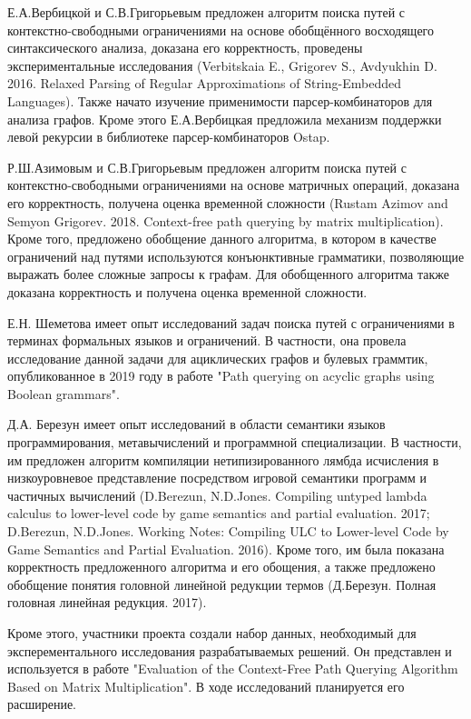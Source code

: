 \documentclass[12pt]{article}  %
\theoremstyle{remark}
\begin{document}
Е.А.Вербицкой и С.В.Григорьевым предложен алгоритм поиска путей с контекстно-свободными ограничениями на основе обобщённого восходящего синтаксического анализа, доказана его корректность, проведены экспериментальные исследования (Verbitskaia E., Grigorev S., Avdyukhin D. 2016. Relaxed Parsing of Regular Approximations of String-Embedded Languages). Также начато изучение применимости парсер-комбинаторов для анализа графов. Кроме этого Е.А.Вербицкая предложила механизм поддержки левой рекурсии в библиотеке парсер-комбинаторов Ostap.

Р.Ш.Азимовым и С.В.Григорьевым предложен алгоритм поиска путей с контекстно-свободными ограничениями на основе матричных операций, доказана его корректность, получена оценка временной сложности (Rustam Azimov and Semyon Grigorev. 2018. Context-free path querying by matrix multiplication). Кроме того, предложено обобщение данного алгоритма, в котором в качестве ограничений над путями используются конъюнктивные грамматики, позволяющие выражать более сложные запросы к графам. Для обобщенного алгоритма также доказана корректность и получена оценка временной сложности.

Е.Н. Шеметова имеет опыт исследований задач поиска путей с ограничениями в терминах формальных языков и ограничений. В частности, она провела исследование данной задачи для ациклических графов и булевых граммтик, опубликованное в 2019 году в работе "Path querying on acyclic graphs using Boolean grammars".

Д.А. Березун имеет опыт исследований в области семантики языков программирования, метавычислений и
программной специализации. В частности, им предложен алгоритм компиляции нетипизированного лямбда исчисления в низкоуровневое представление посредством игровой семантики программ и частичных вычислений (D.Berezun, N.D.Jones. Compiling untyped lambda calculus to lower-level code by game semantics and partial evaluation. 2017; D.Berezun, N.D.Jones. Working Notes: Compiling ULC to Lower-level Code by Game Semantics and Partial Evaluation. 2016). Кроме того, им была показана корректность предложенного алгоритма и его обощения, а также предложено обобщение понятия головной линейной редукции термов (Д.Березун. Полная головная линейная редукция. 2017).

Кроме этого, участники проекта создали набор данных, необходимый для эксперементального исследования разрабатываемых решений. Он представлен и используется в работе "Evaluation of the Context-Free Path Querying Algorithm Based on Matrix Multiplication". В ходе исследований планируется его расширение.
\end{document}
